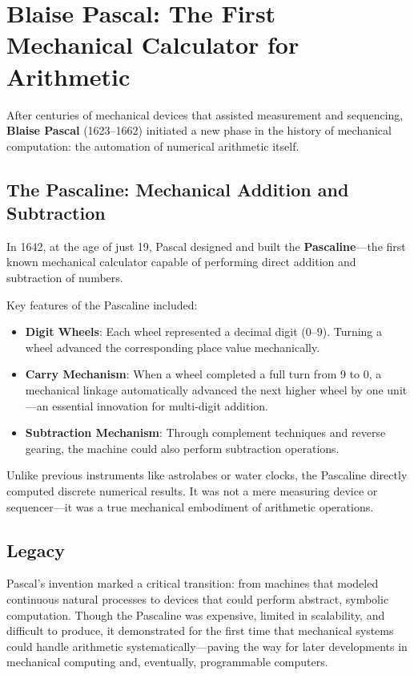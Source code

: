 \section{Blaise Pascal: The First Mechanical Calculator for Arithmetic}

After centuries of mechanical devices that assisted measurement and sequencing, \textbf{Blaise Pascal} (1623--1662) initiated a new phase in the history of mechanical computation: the automation of numerical arithmetic itself.

\subsection{The Pascaline: Mechanical Addition and Subtraction}

In 1642, at the age of just 19, Pascal designed and built the \textbf{Pascaline}---the first known mechanical calculator capable of performing direct addition and subtraction of numbers.

Key features of the Pascaline included:

\begin{itemize}
    \item \textbf{Digit Wheels}: Each wheel represented a decimal digit (0--9). Turning a wheel advanced the corresponding place value mechanically.
    \item \textbf{Carry Mechanism}: When a wheel completed a full turn from 9 to 0, a mechanical linkage automatically advanced the next higher wheel by one unit---an essential innovation for multi-digit addition.
    \item \textbf{Subtraction Mechanism}: Through complement techniques and reverse gearing, the machine could also perform subtraction operations.
\end{itemize}

Unlike previous instruments like astrolabes or water clocks, the Pascaline directly computed discrete numerical results. It was not a mere measuring device or sequencer---it was a true mechanical embodiment of arithmetic operations.

\subsection{Legacy}

Pascal's invention marked a critical transition: from machines that modeled continuous natural processes to devices that could perform abstract, symbolic computation. Though the Pascaline was expensive, limited in scalability, and difficult to produce, it demonstrated for the first time that mechanical systems could handle arithmetic systematically---paving the way for later developments in mechanical computing and, eventually, programmable computers.

